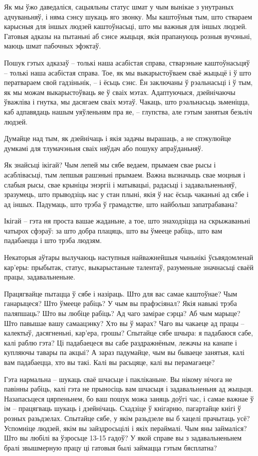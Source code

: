 Як мы ўжо даведаліся, сацыяльны статус шмат у чым вынікае з унутраных адчуваньняў, і няма сэнсу шукаць яго звонку. Мы каштоўныя тым, што ствараем карысныя для іншых людзей каштоўнасьці, што мы важныя для іншых людзей. Гатовыя адказы на пытаньні аб сэнсе жыцьця, якія прапануюць розныя вучэньні, маюць шмат пабочных эфэктаў.

Пошук гэтых адказаў – толькі наша асабістая справа, стварэньне каштоўнасьцяў – толькі наша асабістая справа. Тое, як мы выкарыстоўваем сваё жыцьцё і ў што ператвараем свой гадзіньнік, – і ёсьць сэнс. Ён заключаны ў рэальнасьці і ў тым, як мы можам выкарыстоўваць яе ў сваіх мэтах. Адаптуючыся, дзейнічаючы ўважліва і гнутка, мы дасягаем сваіх мэтаў. Чакаць, што рэальнасьць зьменіцца, каб адпавядаць нашым уяўленьням пра яе, -- глупства, але гэтым занятыя безьліч людзей. 

Думайце над тым, як дзейнічаць і якія задачы вырашаць, а не спэкулюйце думкамі для тлумачэньня сваіх няўдач або пошуку апраўданьняў.

Як знайсьці ікігай? Чым лепей мы сябе ведаем, прымаем свае рысы і асаблівасьці, тым лепшыя рашэньні прымаем. Важна вызначыць свае моцныя і слабыя рысы, свае крыніцы энэргіі і матывацыі, радасьці і задавальненьняў, зразумець, што прыводзіць нас у стан плыні, якія ў нас ёсьць чаканьні ад сябе і ад іншых. Падумаць, што трэба ў грамадстве, што найбольш запатрабавана? 

Ікігай – гэта ня проста вашае жаданьне, а тое, што знаходзіцца на скрыжаваньні чатырох сфэраў: за што добра плацяць, што вы ўмееце рабіць, што вам падабаецца і што трэба людзям.

Некаторыя аўтары вылучаюць наступныя найважнейшыя чыньнікі ўсьвядомленай кар'еры: прыбытак, статус, выкарыстаньне талентаў, разуменьне значнасьці сваёй працы, задавальненьне.

Працягвайце пытацца ў сябе і назіраць. Што для вас самае каштоўнае? Чым ганарыцеся? Што ўмееце рабіць? У чым вы прафэсіянал? Якія навыкі трэба паляпшаць? Што вы любіце рабіць? Ад чаго замірае сэрца? Аб чым марыце? Што павышае вашу самаацэнку? Хто вы ў марах? Чаго вы чакаеце ад працы – калектыў, дасягненьні, кар'ера, грошы? Спытайце сябе шчыра: я падабаюся сабе, калі раблю гэта? Ці падабаецеся вы сабе раздражнёным, лежачы на канапе і купляючы тавары па акцыі? А зараз падумайце, чым вы бываеце занятыя, калі вам падабаецца, хто вы такі. Калі вы расьцяце, калі вы перамагаеце?

Гэта нармальна – шукаць сваё шчасьце і пакліканьне. Вы нікому нічога не павінны рабіць, калі гэта не прыносіць вам шчасьця і задавальненьня ад жыцьця. Назапасьцеся цярпеньнем, бо ваш пошук можа заняць доўгі час, і самае важнае ў ім – працягваць шукаць і дзейнічаць. Схадзіце ў кнігарню, пагартайце кнігі ў розных разьдзелах. Спытайце сябе, у якім разьдзеле вы б хацелі прачытаць усё? Успомніце людзей, якім вы зайздросьцілі і якіх пераймалі. Чым яны займаліся? Што вы любілі ва ўзросьце 13-15 гадоў? У якой справе вы з задавальненьнем бралі звышмерную працу ці гатовыя былі займацца гэтым бясплатна?

